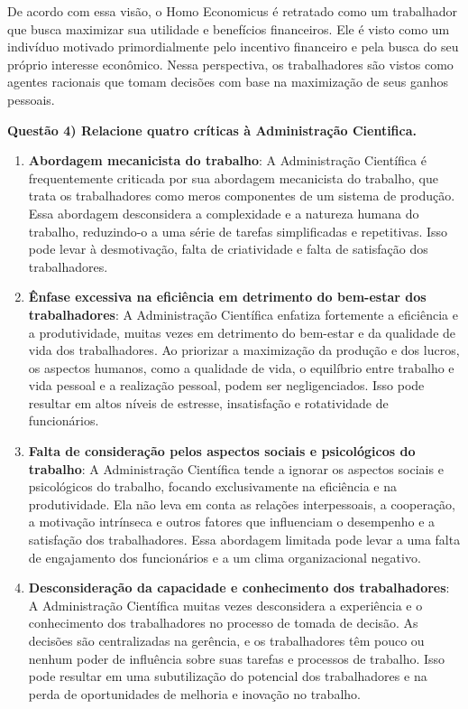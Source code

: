 \documentclass[11pt]{article}
\begin{document}
De acordo com essa visão, o Homo Economicus é retratado como um trabalhador que busca maximizar sua utilidade e benefícios financeiros. Ele é visto como um indivíduo motivado primordialmente pelo incentivo financeiro e pela busca do seu próprio interesse econômico. Nessa perspectiva, os trabalhadores são vistos como agentes racionais que tomam decisões com base na maximização de seus ganhos pessoais.

\noindent \textbf{Questão 4) Relacione quatro críticas à Administração Cientifica.}\par
\begin{enumerate}
    \item \textbf{Abordagem mecanicista do trabalho}: A Administração Científica é frequentemente criticada por sua abordagem mecanicista do trabalho, que trata os trabalhadores como meros componentes de um sistema de produção. Essa abordagem desconsidera a complexidade e a natureza humana do trabalho, reduzindo-o a uma série de tarefas simplificadas e repetitivas. Isso pode levar à desmotivação, falta de criatividade e falta de satisfação dos trabalhadores.
    \item \textbf{Ênfase excessiva na eficiência em detrimento do bem-estar dos trabalhadores}: A Administração Científica enfatiza fortemente a eficiência e a produtividade, muitas vezes em detrimento do bem-estar e da qualidade de vida dos trabalhadores. Ao priorizar a maximização da produção e dos lucros, os aspectos humanos, como a qualidade de vida, o equilíbrio entre trabalho e vida pessoal e a realização pessoal, podem ser negligenciados. Isso pode resultar em altos níveis de estresse, insatisfação e rotatividade de funcionários.
    \item \textbf{Falta de consideração pelos aspectos sociais e psicológicos do trabalho}: A Administração Científica tende a ignorar os aspectos sociais e psicológicos do trabalho, focando exclusivamente na eficiência e na produtividade. Ela não leva em conta as relações interpessoais, a cooperação, a motivação intrínseca e outros fatores que influenciam o desempenho e a satisfação dos trabalhadores. Essa abordagem limitada pode levar a uma falta de engajamento dos funcionários e a um clima organizacional negativo.
    \item \textbf{Desconsideração da capacidade e conhecimento dos trabalhadores}: A Administração Científica muitas vezes desconsidera a experiência e o conhecimento dos trabalhadores no processo de tomada de decisão. As decisões são centralizadas na gerência, e os trabalhadores têm pouco ou nenhum poder de influência sobre suas tarefas e processos de trabalho. Isso pode resultar em uma subutilização do potencial dos trabalhadores e na perda de oportunidades de melhoria e inovação no trabalho.
\end{enumerate}
\end{document}

